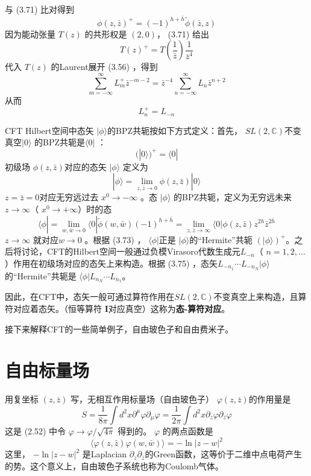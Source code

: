 与 (3.71) 比对得到
\begin{equation}
	\phi(z, \bar{z})^{+}=(-1)^{h+\bar{h}} \tilde{\phi}(\bar{z}, z)
\end{equation}
因为能动张量 $T(z)$ 的共形权是 $(2,0) $， (3.71) 给出
\begin{equation}
	T(z)^{+}=T\left(\frac{1}{\bar{z}}\right) \frac{1}{\bar{z}^{4}}
\end{equation}
代入 $T(z)$ 的Laurent展开 (3.56) ，得到
$$
\sum_{m=-\infty}^{\infty} L_{m}^{+} \bar{z}^{-m-2}=\bar{z}^{-4} \sum_{n=-\infty}^{\infty} L_{n} \bar{z}^{n+2}
$$
从而
\begin{equation}
	L_n^+=L_{-n}
\end{equation}

CFT Hilbert空间中态矢 $|\phi\rangle$的BPZ共轭按如下方式定义：首先， $SL(2,\mathbb{C}) $不变真空$ |0\rangle$ 的BPZ共轭是$ \langle 0|$ ：
$$
(|0\rangle)^{+}=\langle 0|
$$
初级场 $\phi(z,\bar{z}) $对应的态矢 $|\phi\rangle$ 定义为
\begin{equation}
	|\phi\rangle=\lim _{z, \bar{z} \rightarrow 0} \phi(z, \bar{z})|0\rangle
\end{equation}
$z=\bar{z}=0 $对应无穷远过去 $x^0\to -\infty$ 。态 $|\phi\rangle$ 的BPZ共轭，定义为无穷远未来 $z\to\infty $（ $x^0\to +\infty $）时的态
\begin{equation}
	\langle\phi|=\lim _{w, \bar{w} \rightarrow 0}\langle 0| \tilde{\phi}(w, \bar{w})(-1)^{h+\bar{h}}=\lim _{z, \bar{z} \rightarrow \infty}\langle 0| \phi(z, \bar{z}) z^{2 h} \bar{z}^{2 \bar{h}}
\end{equation}
$z\to \infty$ 就对应$ w\to 0$ 。根据 (3.73) ， $\langle \phi| $正是 $|\phi\rangle $的“Hermite”共轭 $(|\phi\rangle)^+ $。之后将讨论，CFT的Hilbert空间一般通过负模Virasoro代数生成元$ L_{-n} $（ $n=1,2,\ldots$）作用在初级场对应的态矢上来构造。根据 (3.75) ，态矢$ L_{-n_{1}} \cdots L_{-n_{N}}|\phi\rangle$ 的“Hermite”共轭是 $\langle\phi| L_{n_{N}} \cdots L_{n_{1}} $。

因此，在CFT中，态矢一般可通过算符作用在$ SL(2,\mathbb{C}) $不变真空上来构造，且算符对应着态矢。（恒等算符 $\boldsymbol{I} $对应真空）这称为\textbf{态-算符对应}。

接下来解释CFT的一些简单例子，自由玻色子和自由费米子。
\section{自由标量场}
用复坐标 $(z,\bar{z})$ 写，无相互作用标量场（自由玻色子） $\varphi(z,\bar{z}) $的作用量是
\begin{equation}
	S=\frac{1}{8 \pi} \int d^{2} x \partial^{\mu} \varphi \partial_{\mu} \varphi=\frac{1}{2 \pi} \int d^{2} x \partial_{z} \varphi \partial_{\bar{z}} \varphi
\end{equation}
这是 (2.52) 中令 $\varphi \to \varphi/\sqrt{4\pi}$ 得到的。 $\varphi$ 的两点函数是
\begin{equation}
	\langle\varphi(z, \bar{z}) \varphi(w, \bar{w})\rangle=-\ln |z-w|^{2}
\end{equation}
这里， $-\ln |z-w|^{2}$ 是Laplacian $\partial_z\partial_{\bar{z}} $的Green函数，这等价于二维中点电荷产生的势。这个意义上，自由玻色子系统也称为Coulomb气体。


